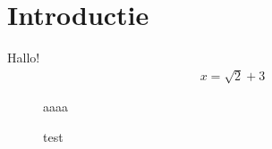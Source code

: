 \documentclass[a6paper]{article}
\begin{document}
    \section{Introductie}

    Hallo!
    \begin{align*}
        x = \sqrt{2} + 3
    \end{align*}


    \begin{figure}
        aaaa
        \caption{test}\label{fig:aa}
    \end{figure}
\end{document}
